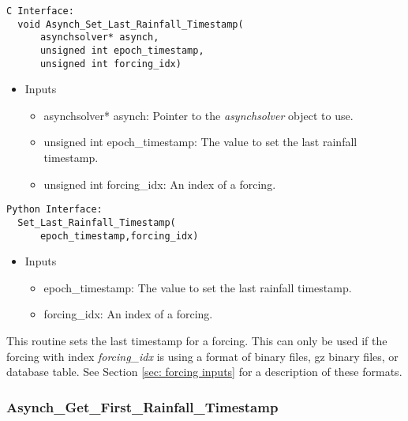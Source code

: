 \documentclass[12pt]{article}
\begin{document}
\begin{lstlisting}[style=CStyle]
  C Interface:
  void Asynch_Set_Last_Rainfall_Timestamp(
      asynchsolver* asynch,
      unsigned int epoch_timestamp,
      unsigned int forcing_idx)
\end{lstlisting}
\begin{itemize}
 \item Inputs
  \begin{itemize}
   \item asynchsolver* asynch: Pointer to the \emph{asynchsolver} object to use.
   \item unsigned int epoch\_timestamp: The value to set the last rainfall timestamp.
   \item unsigned int forcing\_idx: An index of a forcing.
  \end{itemize}
\end{itemize}
\begin{lstlisting}[style=PythonStyle]
  Python Interface:
  Set_Last_Rainfall_Timestamp(
      epoch_timestamp,forcing_idx)
\end{lstlisting}
\begin{itemize}
 \item Inputs
  \begin{itemize}
   \item epoch\_timestamp: The value to set the last rainfall timestamp.
   \item forcing\_idx: An index of a forcing.
  \end{itemize}
\end{itemize}
This routine sets the last timestamp for a forcing. This can only be used if the forcing with index \emph{forcing\_idx} is using a format of binary files, gz binary files, or database table. See Section \ref{sec: forcing inputs} for a description of these formats.


\subsubsection{Asynch\_Get\_First\_Rainfall\_Timestamp} \label{sec: asynch_get_first_rainfall_timestamp}
\end{document}
